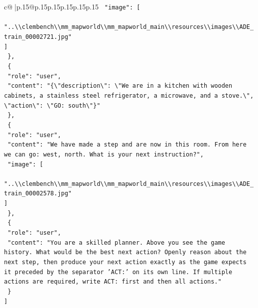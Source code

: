 \documentclass{article}
\begin{document}
{\begin{supertabular}{c@{$\;$}|p{.15\linewidth}@{}p{.15\linewidth}p{.15\linewidth}p{.15\linewidth}p{.15\linewidth}p{.15\linewidth}}
{{{\texttt{    "image": {[}} \\
\texttt{      "..\textbackslash{}\textbackslash{}clembench\textbackslash{}\textbackslash{}mm\_mapworld\textbackslash{}\textbackslash{}mm\_mapworld\_main\textbackslash{}\textbackslash{}resources\textbackslash{}\textbackslash{}images\textbackslash{}\textbackslash{}ADE\_train\_00002721.jpg"} \\
\texttt{    {]}} \\
\texttt{  \},} \\
\texttt{  \{} \\
\texttt{    "role": "user",} \\
\texttt{    "content": "\{\textbackslash{}"description\textbackslash{}": \textbackslash{}"We are in a kitchen with wooden cabinets, a stainless steel refrigerator, a microwave, and a stove.\textbackslash{}", \textbackslash{}"action\textbackslash{}": \textbackslash{}"GO: south\textbackslash{}"\}"} \\
\texttt{  \},} \\
\texttt{  \{} \\
\texttt{    "role": "user",} \\
\texttt{    "content": "We have made a step and are now in this room. From here we can go: west, north. What is your next instruction?",} \\
\texttt{    "image": {[}} \\
\texttt{      "..\textbackslash{}\textbackslash{}clembench\textbackslash{}\textbackslash{}mm\_mapworld\textbackslash{}\textbackslash{}mm\_mapworld\_main\textbackslash{}\textbackslash{}resources\textbackslash{}\textbackslash{}images\textbackslash{}\textbackslash{}ADE\_train\_00002578.jpg"} \\
\texttt{    {]}} \\
\texttt{  \},} \\
\texttt{  \{} \\
\texttt{    "role": "user",} \\
\texttt{    "content": "You are a skilled planner. Above you see the game history. What would be the best next action? Openly reason about the next step, then produce your next action exactly as the game expects it preceded by the separator 'ACT:' on its own line. If multiple actions are required, write ACT: first and then all actions."} \\
\texttt{  \}} \\
\texttt{{]}} \\
            }
        }
    }
     \\ \\


\end{supertabular}}
\end{document}
